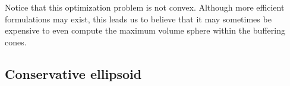 % 
% 
% 
% 
% 
% 
% 

Notice that this optimization problem is not convex.
Although more efficient formulations may exist, this leads us to believe that it may sometimes be expensive
to even compute the maximum volume sphere within the buffering cones.

\subsection{Conservative ellipsoid}
\label{the_conservative_ellipsoid}

